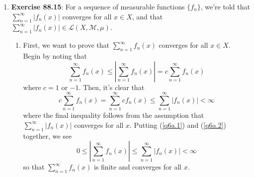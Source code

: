 \documentclass[12pt]{article}
\theoremstyle{plain}
\theoremstyle{definition}
\theoremstyle{remark}
\begin{document}
\begin{enumerate}
\newpage 
\item \textbf{Exercise 88.15}: For a sequence of measurable functions $\{f_n\}$, we're told that $\sum^\infty_{n=1} |f_n(x)|$ converges for all $x\in X$, and that $\sum^\infty_{n=1}|f_n(x)|\in\mathscr{L}(X,\mathscr{M},\mu)$. 
\begin{enumerate}
    \item First, we want to prove that $\sum^\infty_{n=1} f_n(x)$ converges for all $x\in X$. Begin by noting that 
\begin{equation}
    \label{q6a.1}
    \sum^\infty_{n=1} f_n(x) \leq 
    \left\lvert\sum^\infty_{n=1} f_n(x)\right\rvert =
    c \sum^\infty_{n=1} f_n(x)
\end{equation}
where $c=1$ or $-1$. Then, it's clear that 
\begin{equation}
    \label{q6a.2}
    c \sum^\infty_{n=1} f_n(x) =
    \sum^\infty_{n=1} c f_n(x) \leq
    \sum^\infty_{n=1} \left\lvert f_n(x) \right\rvert
    <\infty
\end{equation}
where the final inequality follows from the assumption that $\sum^\infty_{n=1} |f_n(x)|$ converges for all $x$. Putting (\ref{q6a.1}) and (\ref{q6a.2}) together, we see
\begin{equation}
    0\leq \left\lvert\sum^\infty_{n=1} f_n(x) \right\rvert\leq 
    \sum^\infty_{n=1} \left\lvert f_n(x) \right\rvert
    <\infty
\end{equation}
so that $\sum^\infty_{n=1} f_n(x)$ is finite and converges for all $x$.


\end{enumerate}
\end{enumerate}
\end{document}
